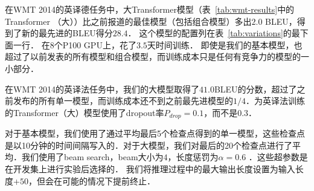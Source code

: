 
在WMT 2014的英译德任务中，大Transformer模型（表~\ref{tab:wmt-results}中的Transformer （大））比之前报道的最佳模型（包括组合模型）多出$2.0$ BLEU，得到了新的最先进的BLEU得分$28.4$． 这个模型的配置列在表~\ref{tab:variations}的最下面一行． 在$8$个P100 GPU上，花了$3.5$天时间训练． 即使是我们的基本模型，也超过了以前发表的所有模型和组合模型，而训练成本只是任何有竞争力的模型的一小部分．


在WMT 2014的英译法任务中，我们的大模型取得了$41.0$BLEU的分数，超过了之前发布的所有单一模型，而训练成本还不到之前最先进模型的$1/4$．为英译法训练的Transformer（大）模型使用了dropout率$P_{drop}=0.1$，而不是$0.3$．


对于基本模型，我们使用了通过平均最后5个检查点得到的单一模型，这些检查点是以10分钟的时间间隔写入的．对于大模型，我们对最后的20个检查点进行了平均．我们使用了beam search，beam大小为$4$，长度惩罚为$\alpha=0.6$ \citep{wu2016google}．这些超参数是在开发集上进行实验后选择的． 我们将推理过程中的最大输出长度设置为输入长度+$50$，但会在可能的情况下提前终止\citep{wu2016google}．

